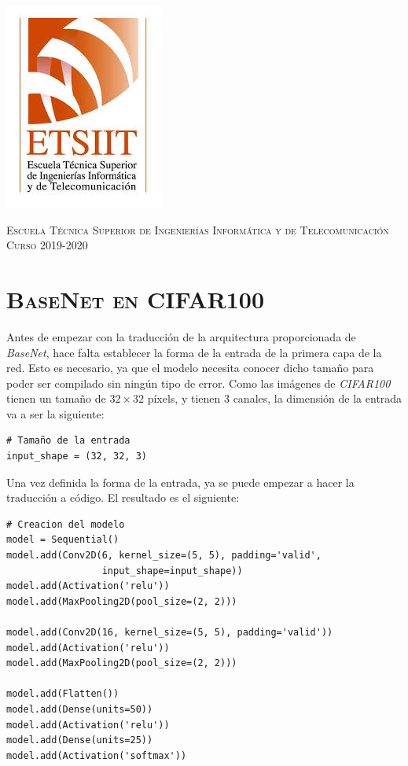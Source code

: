 \documentclass[11pt,a4paper]{article}
\begin{document}
\begin{titlepage}
\begin{minipage}{\textwidth}
\includegraphics[scale=0.3]{img/etsiit.jpeg}

\vspace{0.7cm}
\textsc{Escuela Técnica Superior de Ingenierías Informática y de Telecomunicación}\\
\vspace{1cm}
\textsc{Curso 2019-2020}
\end{minipage}
\end{titlepage}

\tableofcontents
\thispagestyle{empty}				%

\newpage

\setlength{\parskip}{1em}

\section{\textsc{BaseNet en CIFAR100}}

Antes de empezar con la traducción de la arquitectura proporcionada de \textit{BaseNet}, hace falta establecer la forma
de la entrada de la primera capa de la red. Esto es necesario, ya que el modelo necesita conocer dicho tamaño para poder
ser compilado sin ningún tipo de error. Como las imágenes de \textit{CIFAR100} tienen un tamaño de $32 \times 32$
píxels, y tienen 3 canales, la dimensión de la entrada va a ser la siguiente:

\begin{lstlisting}
# Tamaño de la entrada
input_shape = (32, 32, 3)
\end{lstlisting}

Una vez definida la forma de la entrada, ya se puede empezar a hacer la traducción a código. El resultado es el siguiente:

\begin{lstlisting}
# Creacion del modelo
model = Sequential()
model.add(Conv2D(6, kernel_size=(5, 5), padding='valid',
				 input_shape=input_shape))
model.add(Activation('relu'))
model.add(MaxPooling2D(pool_size=(2, 2)))

model.add(Conv2D(16, kernel_size=(5, 5), padding='valid'))
model.add(Activation('relu'))
model.add(MaxPooling2D(pool_size=(2, 2)))

model.add(Flatten())
model.add(Dense(units=50))
model.add(Activation('relu'))
model.add(Dense(units=25))
model.add(Activation('softmax'))
\end{lstlisting}
\end{document}
